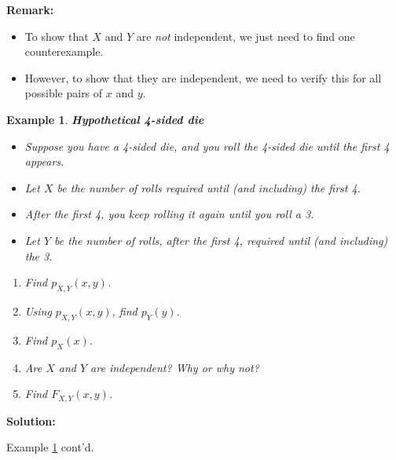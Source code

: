 \documentclass[12pt]{amsart}
\newtheorem{example}[theorem]{Example}
\begin{document}
{\textbf{Remark:} 
\begin{itemize}
\item To show that $X$ and $Y$ are \textit{not} independent, we just need to find one counterexample. 
\item However, to show that they are independent, we need to verify this for all possible pairs of $x$ and $y$.
\end{itemize}




\newpage


\begin{example}\label{Die4sided} \textbf{Hypothetical 4-sided die}
\begin{itemize} 
\item Suppose you have a 4-sided die, and you roll the 4-sided die until the first 4 appears.
\item Let $X$ be the number of rolls required until (and including) the first 4.
\item After the first 4, you keep rolling it again until you roll a 3. 
\item Let $Y$ be the number of rolls, after the first 4, required until (and including) the 3.
\end{itemize}

\begin{enumerate}
\item Find $p_{X,Y}(x,y)$.
\item Using $p_{X,Y}(x,y)$, find $p_{Y}(y)$.
\item Find $p_{X}(x)$.
\item Are $X$ and $Y$ are independent? Why or why not?
\item Find $F_{X,Y}(x,y)$.
\end{enumerate}


\end{example}

\textbf{Solution:}

\newpage
    
Example \ref{Die4sided} cont'd.    







}  %
\end{document}
